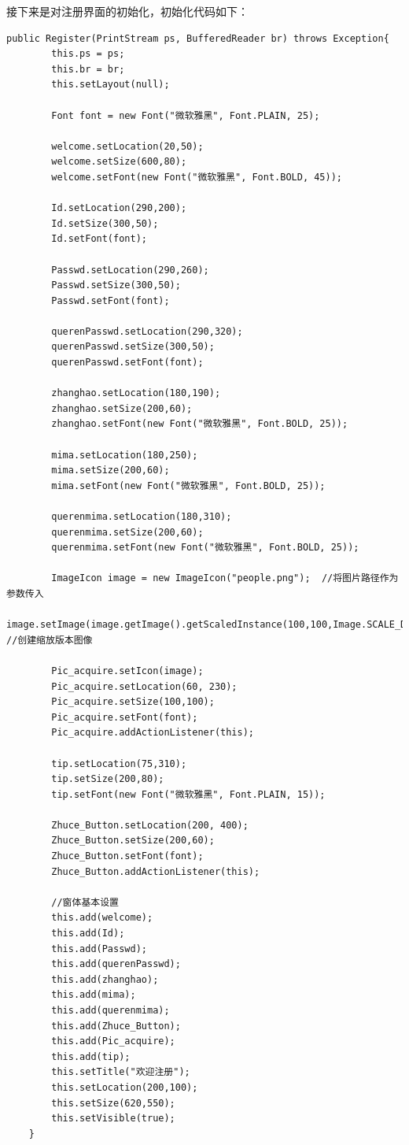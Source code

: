 \documentclass[UTF8,12pt]{article}
\begin{document}
接下来是对注册界面的初始化，初始化代码如下：
\begin{lstlisting}[title=注册界面的初始化,frame=shadowbox]
    public Register(PrintStream ps, BufferedReader br) throws Exception{
        this.ps = ps;
        this.br = br;
        this.setLayout(null);

        Font font = new Font("微软雅黑", Font.PLAIN, 25);

        welcome.setLocation(20,50);
        welcome.setSize(600,80);
        welcome.setFont(new Font("微软雅黑", Font.BOLD, 45));

        Id.setLocation(290,200);
        Id.setSize(300,50);
        Id.setFont(font);

        Passwd.setLocation(290,260);
        Passwd.setSize(300,50);
        Passwd.setFont(font);

        querenPasswd.setLocation(290,320);
        querenPasswd.setSize(300,50);
        querenPasswd.setFont(font);

        zhanghao.setLocation(180,190);
        zhanghao.setSize(200,60);
        zhanghao.setFont(new Font("微软雅黑", Font.BOLD, 25));

        mima.setLocation(180,250);
        mima.setSize(200,60);
        mima.setFont(new Font("微软雅黑", Font.BOLD, 25));

        querenmima.setLocation(180,310);
        querenmima.setSize(200,60);
        querenmima.setFont(new Font("微软雅黑", Font.BOLD, 25));

        ImageIcon image = new ImageIcon("people.png");  //将图片路径作为参数传入
        image.setImage(image.getImage().getScaledInstance(100,100,Image.SCALE_DEFAULT));  //创建缩放版本图像

        Pic_acquire.setIcon(image);
        Pic_acquire.setLocation(60, 230);
        Pic_acquire.setSize(100,100);
        Pic_acquire.setFont(font);
        Pic_acquire.addActionListener(this);

        tip.setLocation(75,310);
        tip.setSize(200,80);
        tip.setFont(new Font("微软雅黑", Font.PLAIN, 15));

        Zhuce_Button.setLocation(200, 400);
        Zhuce_Button.setSize(200,60);
        Zhuce_Button.setFont(font);
        Zhuce_Button.addActionListener(this);

        //窗体基本设置
        this.add(welcome);
        this.add(Id);
        this.add(Passwd);
        this.add(querenPasswd);
        this.add(zhanghao);
        this.add(mima);
        this.add(querenmima);
        this.add(Zhuce_Button);
        this.add(Pic_acquire);
        this.add(tip);
        this.setTitle("欢迎注册");
        this.setLocation(200,100);
        this.setSize(620,550);
        this.setVisible(true);
    }
\end{lstlisting}
\end{document}
